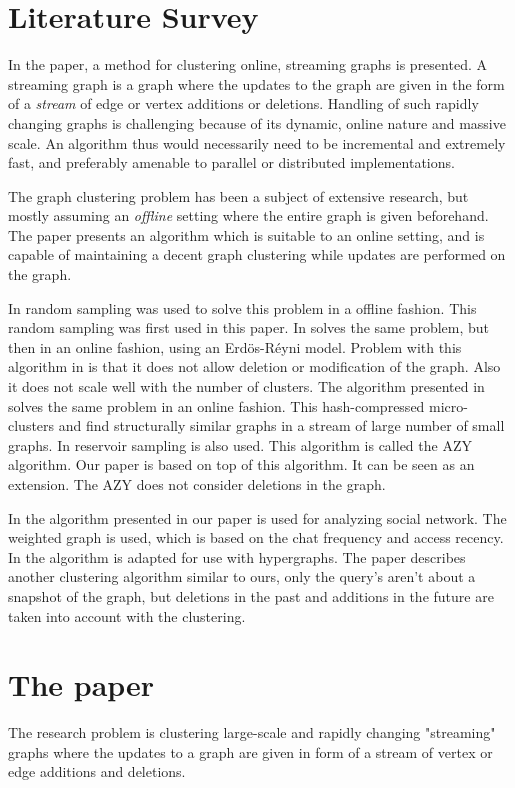 \documentclass[a4paper]{article}
\begin{document}
\pagebreak
\section{Literature Survey}\label{sec:LS}
In the paper, a method for clustering online, streaming graphs is presented. A streaming graph is a graph where the updates to the graph are given in the form of a \textit{stream} of edge or vertex additions or deletions. Handling of such rapidly changing graphs is challenging because of its dynamic, online nature and massive scale. An algorithm thus would necessarily need to be incremental and extremely fast, and preferably amenable to parallel or distributed implementations. 

The graph clustering problem has been a subject of extensive research, but mostly assuming an \textit{offline} setting where the entire graph is given beforehand. The paper presents an algorithm which is suitable to an online setting, and is capable of maintaining a decent graph clustering while updates are performed on the graph. 

In \cite{11} random sampling was used to solve this problem in a offline fashion. This random sampling was first used in this paper. In \cite{12} solves the same problem, but then in an online fashion, using an Erdös-Réyni model. Problem with this algorithm in \cite{12} is that it does not allow deletion or modification of the graph. Also it does not scale well with the number of clusters. The algorithm presented in  \cite{13} solves the same problem in an online fashion. This hash-compressed micro-clusters and find structurally similar graphs in a stream of large number of small graphs. In \cite{14} reservoir sampling is also used. This algorithm is called the AZY algorithm. Our paper is based on top of this algorithm. It can be seen as an extension. The AZY does not consider deletions in the graph.

In \cite{DynPar} the algorithm presented in our paper is used for analyzing social network. The weighted graph is used, which is based on the chat frequency and access recency. In \cite{StrHyp} the algorithm is adapted for use with hypergraphs. The paper \cite{ProStr} describes another clustering algorithm similar to ours, only the query's aren't about a snapshot of the graph, but deletions in the past and additions in the future are taken into account with the clustering.

\pagebreak
\section{The paper}\label{sec:Pa}
The research problem is clustering large-scale and rapidly changing "streaming" graphs where the updates to a graph are given in form of a stream of vertex or edge additions and deletions. 
\end{document}
